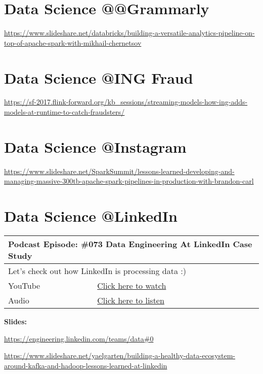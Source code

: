 \documentclass[12pt, numbers=noenddot]{scrreprt} %
\begin{document}
\section{Data Science @@Grammarly}
\url{https://www.slideshare.net/databricks/building-a-versatile-analytics-pipeline-on-top-of-apache-spark-with-mikhail-chernetsov}

\section{Data Science @ING Fraud}
\url{https://sf-2017.flink-forward.org/kb_sessions/streaming-models-how-ing-adds-models-at-runtime-to-catch-fraudsters/}

\section{Data Science @Instagram}
\url{https://www.slideshare.net/SparkSummit/lessons-learned-developing-and-managing-massive-300tb-apache-spark-pipelines-in-production-with-brandon-carl}

\section{Data Science @LinkedIn}

\begin{table}[h]
\begin{tabular}{ll}
\hline
\multicolumn{2}{l}{\textbf{Podcast Episode:} \#073 Data Engineering At LinkedIn Case Study} \\ \hline
\multicolumn{2}{p{15cm}}{Let's check out how LinkedIn is processing data :)}         \\ \hline
\multicolumn{1}{l|}{YouTube}   & \href{https://youtu.be/wgfoE8Jbr_Q}{Click here to watch}   \\ 
\multicolumn{1}{l|}{Audio}     & \href{https://anchor.fm/andreaskayy/episodes/073-Data-Engineering-At-LinkedIn-Case-Study-e45is6}{Click here to listen}   \\ \hline
\end{tabular}
\end{table}

\textbf{Slides:}

\url{https://engineering.linkedin.com/teams/data#0}

\url{https://www.slideshare.net/yaelgarten/building-a-healthy-data-ecosystem-around-kafka-and-hadoop-lessons-learned-at-linkedin}
\end{document}
